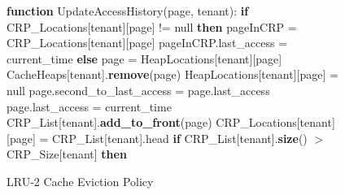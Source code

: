 \begin{figure}[htbp]
    \centering
    \begin{minipage}{\linewidth}
    \begin{algorithm}[H]
        \caption{LRU-2 Cache Eviction Policy}
        \begin{algorithmic}
            \STATE \textbf{function} UpdateAccessHistory(page, tenant):
            \STATE \hspace{\algorithmicindent} \textbf{if} CRP\_Locations[tenant][page] != null \textbf{then}
            \STATE \hspace{\algorithmicindent} \hspace{\algorithmicindent} pageInCRP = CRP\_Locations[tenant][page]
            \STATE \hspace{\algorithmicindent} \hspace{\algorithmicindent} pageInCRP.last\_access = current\_time
            \STATE \hspace{\algorithmicindent} \textbf{else}
            \STATE \hspace{\algorithmicindent} \hspace{\algorithmicindent} page = HeapLocations[tenant][page]
            \STATE \hspace{\algorithmicindent} \hspace{\algorithmicindent} CacheHeaps[tenant].\textbf{remove}(page)
            \STATE \hspace{\algorithmicindent} \hspace{\algorithmicindent} HeapLocations[tenant][page] = null
            \STATE \hspace{\algorithmicindent} \hspace{\algorithmicindent} page.second\_to\_last\_access = page.last\_access
            \STATE \hspace{\algorithmicindent} \hspace{\algorithmicindent} page.last\_access = current\_time
            \STATE \hspace{\algorithmicindent} \hspace{\algorithmicindent} CRP\_List[tenant].\textbf{add\_to\_front}(page)
            \STATE \hspace{\algorithmicindent} \hspace{\algorithmicindent} CRP\_Locations[tenant][page] = CRP\_List[tenant].head
            \STATE \hspace{\algorithmicindent} \hspace{\algorithmicindent} \textbf{if} CRP\_List[tenant].\textbf{size}() $>$ CRP\_Size[tenant] \textbf{then}

\end{algorithmic}
\end{algorithm}
\end{minipage}
\end{figure}
